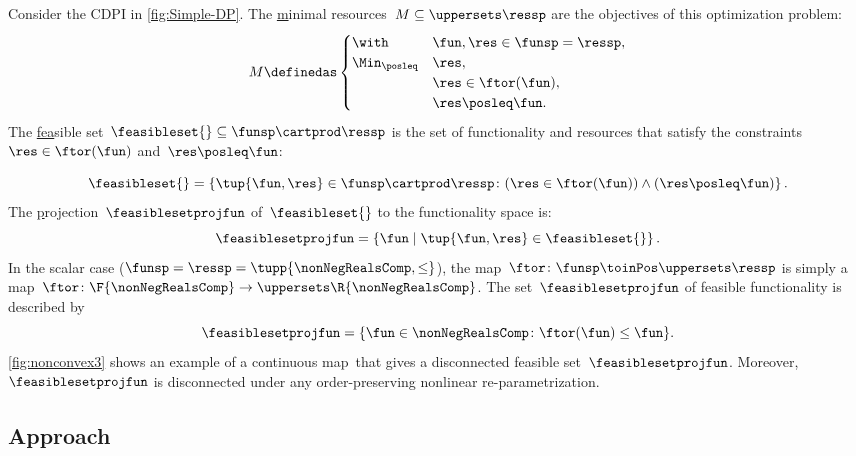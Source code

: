 \begin{example}
	\label{exa:one}
	Consider the CDPI in \cref{fig:Simple-DP}.
	The \uline{m}inimal resources~$M\subseteq\uppersets \ressp$ are the objectives of this optimization problem:
	\begin{equation*}
		M\definedas\begin{cases}
			\with          & \fun,\res\in\funsp=\ressp, \\
			\Min_{\posleq} & \res,                      \\
			               & \res\in\ftor(\fun),        \\
			               & \res\posleq\fun.
		\end{cases}
	\end{equation*}
	The \uline{fea}sible set~$\feasibleset{}\subseteq\funsp\cartprod\ressp$ is the set of functionality and resources that satisfy the constraints~$\res\in\ftor(\fun)$ and~$\res\posleq\fun$:

	\begin{equation}
		\feasibleset{}=\left\{ \tup{\fun,\res}\in\funsp\cartprod\ressp\colon (\res\in\ftor(\fun))\wedge(\res\posleq\fun)\right\} .\label{eq:feasible}
	\end{equation}
	The \uline{p}rojection~$\feasiblesetprojfun$ of~$\feasibleset{}$ to the functionality space is:
	\begin{equation*}
		\feasiblesetprojfun=\left\{ \fun\mid\tup{\fun,\res} \in\feasibleset{}\right\}.
	\end{equation*}
	In the scalar case ($\funsp=\ressp=\tupp{\nonNegRealsComp,\leq}$), the map~$\ftor\colon\funsp\toinPos\uppersets \ressp$ is simply a map~$\ftor\colon\F{\nonNegRealsComp}\to \uppersets\R{\nonNegRealsComp}$.
	The set~$\feasiblesetprojfun$ of feasible functionality is described by
	\begin{equation}
		\feasiblesetprojfun=\{\fun\in\nonNegRealsComp\colon \ftor(\fun)\leq\fun\}.\label{eq:Pfeasible}
	\end{equation}
	\cref{fig:nonconvex3} shows an example of a continuous map~\ftor that gives a disconnected feasible set~$\feasiblesetprojfun$.
	Moreover,~$\feasiblesetprojfun$ is disconnected under any order-preserving nonlinear re-parametrization.

\end{example}

\subsection{Approach}

